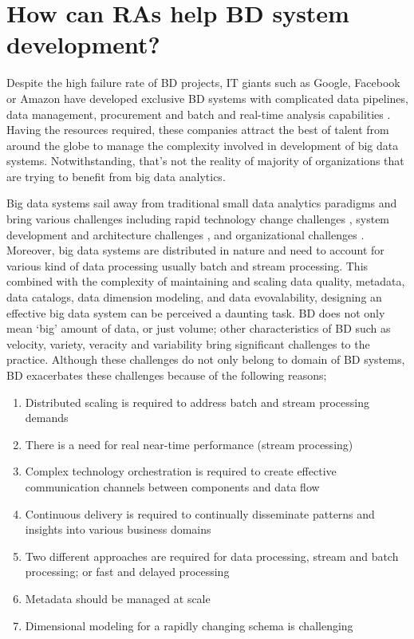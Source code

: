 \documentclass[review]{elsarticle}
\begin{document}
\section{How can RAs help BD system development? }

Despite the high failure rate of BD projects, IT giants such as Google, Facebook or Amazon have developed exclusive BD systems with complicated data pipelines, data management, procurement and batch and real-time analysis capabilities \cite{kohler2019towards}. Having the resources required, these companies attract the best of talent from around the globe to manage the complexity involved in development of big data systems. Notwithstanding, that’s not the reality of majority of organizations that are trying to benefit from big data analytics. 

Big data systems sail away from traditional small data analytics paradigms and bring various challenges including rapid technology change challenges \cite{chen2017big}, system development and architecture challenges \cite{jagadish2014big}, and organizational challenges \cite{AtaeiHype}. Moreover, big data systems are distributed in nature and need to account for various kind of data processing usually batch and stream processing. This combined with the complexity of maintaining and scaling data quality, metadata, data catalogs, data dimension modeling, and data evovalability, designing an effective big data system can be perceived a daunting task. BD does not only mean ‘big’ amount of data, or just volume; other characteristics of BD such as velocity, variety, veracity and variability bring significant challenges to the practice. Although these challenges do not only belong to domain of BD systems, BD exacerbates these challenges because of the following reasons;

\begin{enumerate}
    \item Distributed scaling is required to address batch and stream processing demands
    \item There is a need for real near-time performance (stream processing) 
    \item Complex technology orchestration is required to create effective communication channels between components and data flow
    \item Continuous delivery is required to continually disseminate patterns and insights into various business domains
    \item Two different approaches are required for data processing, stream and batch processing; or fast and delayed processing 
    \item Metadata should be managed at scale 
    \item Dimensional modeling for a rapidly changing schema is challenging 
\end{enumerate}
\end{document}
